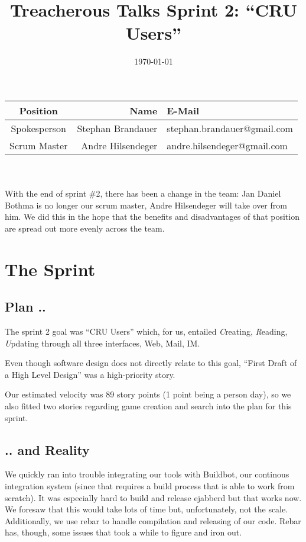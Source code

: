 \documentclass[11pt,a4paper]{article}
\begin{document}
\title{Treacherous Talks 
  Sprint 2: ``CRU Users''}
\date{\today}
\author{}
\maketitle

\begin{tabular}{c|rl}
Position     & Name              & E-Mail \\
\hline
Spokesperson & Stephan Brandauer & stephan.brandauer@gmail.com \\
Scrum Master & Andre Hilsendeger & andre.hilsendeger@gmail.com
\end{tabular}
\\
\\
With the end of sprint \#2, there has been a change in the team:
Jan Daniel Bothma is no longer our scrum master, Andre Hilsendeger will
take over from him. We did this in the hope that the benefits and disadvantages
of that position are spread out more evenly across the team.

\section{The Sprint}
\subsection{Plan ..}
The sprint 2 goal was ``CRU Users'' which, for us, entailed {\it C}reating, {\it R}eading, {\it U}pdating through all three interfaces, Web, Mail, IM.

Even though software design does not directly relate to this goal, ``First Draft of a High Level Design'' was a high-priority story.

Our estimated velocity was 89 story points (1 point being a person day), so we 
also fitted two stories regarding game creation and search into the plan for 
this sprint.

\subsection{.. and Reality}

We quickly ran into trouble integrating our tools with Buildbot, our continous 
integration system (since that requires a build process that is able to work 
from scratch). It was especially hard to build and release ejabberd but that 
works now.
We foresaw that this would take lots of time but, unfortunately, not the scale.
Additionally, we use rebar to handle compilation and releasing of our code. 
Rebar has, though, some issues that took a while to figure and iron out.
\end{document}
